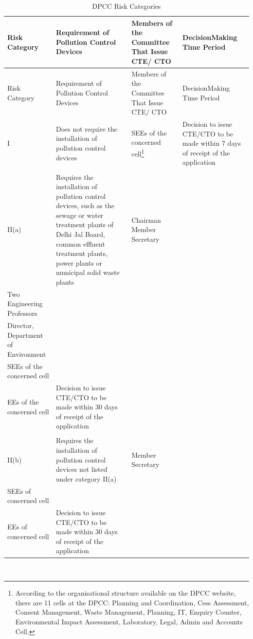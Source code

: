 \documentclass[a4paper, 12pt, twoside]{article}
\newcommand\tabitem{\makebox[1em][r]{\textbullet~}}
\begin{document}
\begin{longtable}{>{\raggedright}p{2cm}>{\raggedright}p{4cm}>{\raggedright}p{4cm}>{\raggedright\arraybackslash}p{4cm}}
\caption{DPCC Risk Categories} \\
\toprule
Risk Category & Requirement of Pollution Control Devices & Members of the Committee That Issue CTE/ CTO & DecisionMaking Time Period \\
\midrule
\endfirsthead
\toprule
Risk Category & Requirement of Pollution Control Devices & Members of the Committee That Issue CTE/ CTO & DecisionMaking Time Period \\
\midrule
\endhead
\bottomrule
\endfoot
\endlastfoot
I & Does not require the installation of pollution control devices & \tabitem SEEs of the concerned cell\footnote{According to the organisational structure available on the DPCC website, there are 11 cells at the DPCC: Planning and Coordination, Cess Assessment, Consent Management, Waste Management, Planning, IT, Enquiry Counter, Environmental Impact Assessment, Laboratory, Legal, Admin and Accounts Cell.} & Decision to issue CTE/CTO to be made within 7 days of receipt of the application \\
 & & &  \\
II(a) & Requires the installation of pollution control devices, such as the sewage or water treatment plants of Delhi Jal Board, common effluent treatment plants, power plants or municipal solid waste plants & \tabitem Chairman  \tabitem Member Secretary \\  \tabitem Two Engineering Professors \\ \tabitem Director, Department of Environment \\ \tabitem SEEs of the concerned cell \\ \tabitem EEs of the concerned cell 
 & Decision to issue CTE/CTO to be made within 30 days of receipt of the application \\
  & & & \\
II(b) & Requires the installation of pollution control devices not listed under category II(a) & \tabitem Member Secretary \\ \tabitem SEEs of concerned cell \\ \tabitem  EEs of concerned cell & Decision to issue CTE/CTO to be made within 30 days of receipt of the application \\
\bottomrule
\end{longtable}
\textit{\parencite{DPCC17}}\\
         
\end{document}
